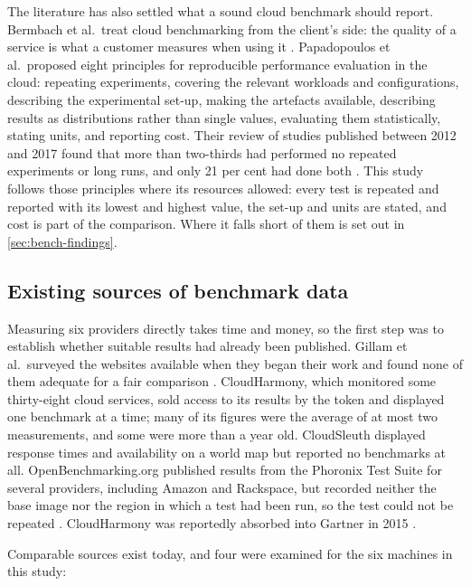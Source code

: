 The literature has also settled what a sound cloud benchmark should report.
Bermbach et al.\ treat cloud benchmarking from the client's side: the quality of
a service is what a customer measures when using it
\cite{Bermbach_CloudServiceBenchmarking_2017}. Papadopoulos et al.\ proposed
eight principles for reproducible performance evaluation in the cloud: repeating
experiments, covering the relevant workloads and configurations, describing the
experimental set-up, making the artefacts available, describing results as
distributions rather than single values, evaluating them statistically, stating
units, and reporting cost. Their review of studies published between 2012 and
2017 found that more than two-thirds had performed no repeated experiments or
long runs, and only 21 per cent had done both \cite{Papadopoulos_Principles_2021}.
This study follows those principles where its resources allowed: every test is
repeated and reported with its lowest and highest value, the set-up and units are
stated, and cost is part of the comparison. Where it falls short of them is set
out in \cref{sec:bench-findings}.


\subsection{Existing sources of benchmark data}

Measuring six providers directly takes time and money, so the first step was to
establish whether suitable results had already been published. Gillam et al.\
surveyed the websites available when they began their work and found none of
them adequate for a fair comparison \cite{Gillam_FairBenchmarking_2013}.
CloudHarmony, which monitored some thirty-eight cloud services, sold access to
its results by the token and displayed one benchmark at a time; many of its
figures were the average of at most two measurements, and some were more than a
year old. CloudSleuth displayed response times and availability on a world map
but reported no benchmarks at all. OpenBenchmarking.org published results from
the Phoronix Test Suite for several providers, including Amazon and Rackspace,
but recorded neither the base image nor the region in which a test had been run,
so the test could not be repeated \cite{Gillam_FairBenchmarking_2013}.
CloudHarmony was reportedly absorbed into Gartner in 2015
\cite{Fortune_CloudHarmony_2015}.

Comparable sources exist today, and four were examined for the six machines in
this study:

